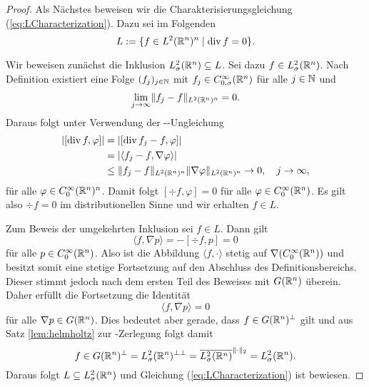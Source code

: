 \begin{proof}
  Als Nächstes beweisen wir die Charakterisierungsgleichung (\ref{eq:LCharacterization}).
  Dazu sei im Folgenden
  $$
  L := \{ f \in L^2(\mathbb{R}^n)^n \mid \mathrm{div\,} f = 0 \}.
  $$

  Wir beweisen zunächst die Inklusion $L_\sigma^2(\mathbb{R}^n) \subseteq L$.
  Sei dazu $f \in L_\sigma^2(\mathbb{R}^n)$.
  Nach Definition existiert eine Folge $(f_j)_{j \in \mathbb{N}}$ mit $f_j \in C_{0,\sigma}^\infty(\mathbb{R}^n)$ für alle $j \in \mathbb{N}$ und 
  $$
  \lim_{j \to \infty} \lVert f_j - f \rVert_{L^2(\mathbb{R}^n)^n} = 0.
  $$
  Daraus folgt unter Verwendung der \cauchy\hyp{}\schwartz\hyp{}Ungleichung
  \begin{align*}
    |[\mathrm{div\,} f, \varphi] |
    &= |[\mathrm{div\,} f_j - f, \varphi] | \\
    &= |\langle f_j - f, \nabla \varphi \rangle| \\
    & \leq \lVert f_j - f \rVert_{L^2(\mathbb{R}^n)^n} \lVert \nabla \varphi \rVert_{L^2(\mathbb{R}^n)^n} 
    \to 0, \quad j \to \infty,
  \end{align*}
  für alle $\varphi \in C_0^\infty(\mathbb{R}^n)^n$.
  Damit folgt $[\div f, \varphi] = 0$ für alle $\varphi \in C_0^\infty(\mathbb{R}^n)$.
  Es gilt also $\div f = 0$ im distributionellen Sinne und wir erhalten $f \in L$.

  Zum Beweis der umgekehrten Inklusion sei $f \in L$.
  Dann gilt
  $$
  \langle f, \nabla p \rangle = -[\div f, p] = 0
  $$
  für alle $p \in C_0^\infty(\mathbb{R}^n)$.
  Also ist die Abbildung $\langle f, \cdot\rangle$ stetig auf $\nabla (C_0^\infty(\mathbb{R}^n))$ und besitzt somit eine stetige Fortsetzung auf den Abschluss des Definitionsbereichs. 
  Dieser stimmt jedoch nach dem ersten Teil des Beweises mit $G(\mathbb{R}^n)$ überein.
  Daher erfüllt die Fortsetzung die Identität
  $$
  \langle f, \nabla p \rangle = 0 
  $$
  für alle $\nabla p \in G(\mathbb{R}^n)$.
  Dies bedeutet aber gerade, dass $f \in G(\mathbb{R}^n)^\perp$ gilt und aus Satz \ref{lem:helmholtz} zur \helmholtz\hyp{}Zerlegung folgt damit
  $$
  f \in G(\mathbb{R}^n)^\perp 
  = L_\sigma^2(\mathbb{R}^n)^{\perp\perp} 
  = \overline{L_\sigma^2(\mathbb{R}^n)}^{\lVert \cdot \rVert_2}
  = L_\sigma^2(\mathbb{R}^n).
  $$
  Daraus folgt $L \subseteq L_\sigma^2(\mathbb{R}^n)$ und Gleichung (\ref{eq:LCharacterization}) ist bewiesen.
\end{proof}
